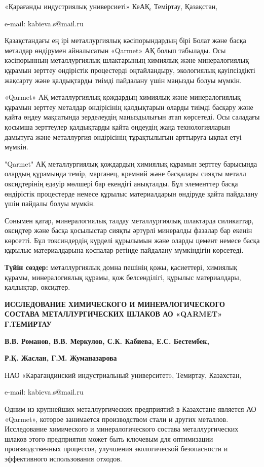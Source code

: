 «Қарағанды индустриялық универсиеті» КеАҚ, Теміртау, Қазақстан,

e-mail: kabieva.s@mail.ru

Қазақстандағы ең ірі металлургиялық кәсіпорындардың бірі Болат және
басқа металдар өндірумен айналысатын «Qarmet» АҚ болып табылады. Осы
кәсіпорынның металлургиялық шлактарының химиялық және минералогиялық
құрамын зерттеу өндірістік процестерді оңтайландыру, экологиялық
қауіпсіздікті жақсарту және қалдықтарды тиімді пайдалану үшін маңызды
болуы мүмкін.

«Qarmet» АҚ металлургиялық қождардың химиялық және минералогиялық
құрамын зерттеу металдар өндірісінің қалдықтарын оларды тиімді басқару
және қайта өңдеу мақсатында зерделеудің маңыздылығын атап көрсетеді. Осы
саладағы қосымша зерттеулер қалдықтарды қайта өңдеудің жаңа
технологияларын дамытуға және металлургия өндірісінің тұрақтылығын
арттыруға ықпал етуі мүмкін.

"Qarmet" АҚ металлургиялық қождардың химиялық құрамын зерттеу барысында
олардың құрамында темір, марганец, кремний және басқалары сияқты металл
оксидтерінің едәуір мөлшері бар екендігі анықталды. Бұл элементтер басқа
өндірістік процестерде немесе құрылыс материалдарын өндіруде қайта
пайдалану үшін пайдалы болуы мүмкін.

Сонымен қатар, минералогиялық талдау металлургиялық шлактарда
силикаттар, оксидтер және басқа қосылыстар сияқты әртүрлі минералды
фазалар бар екенін көрсетті. Бұл токсиндердің күрделі құрылымын және
оларды цемент немесе басқа құрылыс материалдарына қоспалар ретінде
пайдалану мүмкіндігін көрсетеді.

{\bfseries Түйін сөздер:} металлургиялық домна пешінің қожы, қасиеттері,
химиялық құрамы, минералогиялық құрамы, қож белсенділігі, құрылыс
материалдары, қалдықтар, оксидтер.

{\bfseries ИССЛЕДОВАНИЕ ХИМИЧЕСКОГО И МИНЕРАЛОГИЧЕСКОГО СОСТАВА
МЕТАЛЛУРГИЧЕСКИХ ШЛАКОВ АО «QARMET» Г.ТЕМИРТАУ}

{\bfseries В.В. Романов, В.В. Меркулов, С.К. Кабиева, Е.С. Бестембек,}

{\bfseries Р.Қ. Жаслан, Г.М. Жуманазарова}

НАО «Карагандинский индустриальный университет», Темиртау, Казахстан,

e-mail: kabieva.s@mail.ru

Одним из крупнейших металлургических предприятий в Казахстане является
АО «Qarmet», которое занимается производством стали и других металлов.
Исследование химического и минералогического состава металлургических
шлаков этого предприятия может быть ключевым для оптимизации
производственных процессов, улучшения экологической безопасности и
эффективного использования отходов.

